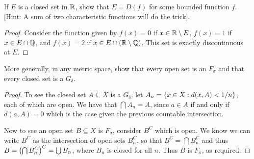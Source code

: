 \begin{exercise}{9}
If $E$ is a closed set in $\mathbb{R}$, show that $E=D(f)$ for some bounded function $f$.
[Hint: A sum of two characteristic functions will do the trick].
\end{exercise}
\begin{proof}
Consider the function given by $f(x) = 0$ if $x \in \mathbb{R} \setminus E$, $f(x) = 1$ if $x \in E\cap\mathbb{Q}$, and $f(x) = 2$ if $x \in E\cap(\mathbb{R} \setminus \mathbb{Q})$.
This set is exactly discontinuous at $E$.
\end{proof} 

\begin{exercise}{12}
More generally, in any metric space, show that every open set is an $F_\sigma$ and that every closed set is a $G_\delta$.
\end{exercise}
\begin{proof}
To see the closed set $A\subseteq X$ is a $G_\delta$, let $A_n=\{x\in X: d(x,A)<1/n\}$, each of which are open.
We have that $\bigcap A_n = A$, since $a\in A$ if and only if $d(a,A)=0$ which is the case given the previous countable intersection.

Now to see an open set $B\subseteq X$ is $F_\sigma$, consider $B^C$ which is open.
We know we can write $B^C$ as the intersection of open sets $B_n^C$, so that $B^C = \bigcap B_n^C$ and thus $B = \left( \bigcap B_n^C\right)^C = \bigcup B_n$, where $B_n$ is closed for all $n$. 
Thus $B$ is $F_\sigma$, as required.
\end{proof} 
